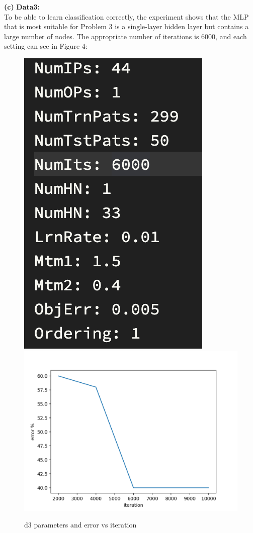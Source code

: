 \documentclass[11pt]{article}
\renewcommand\part[1]{\vspace{.10in}\textbf{(#1)}}
\newcommand\three{\vspace{.10in}\textbf{Data3: }}
\begin{document}
\part{c} \three\\
To be able to learn classification correctly, the experiment shows that the MLP that is most suitable for Problem 3 is a single-layer hidden layer but contains a large number of nodes. The appropriate number of iterations is 6000, and each setting can see in Figure 4:\\
\begin{figure}[!ht]
    \centering
    \includegraphics[scale=0.8]{3-par.png}
    \includegraphics[scale=1]{Figure_3.png}
	\caption{d3 parameters and error vs iteration}
\end{figure}
\end{document}

